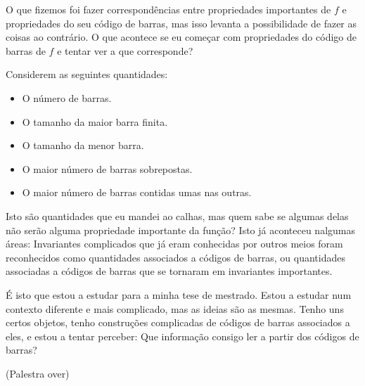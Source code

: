 \documentclass[12pt]{article}
\theoremstyle{nonumberplain}
\begin{document}
O que fizemos foi fazer correspondências entre propriedades importantes de $f$ e propriedades do seu código de barras, mas isso levanta a possibilidade de fazer as coisas ao contrário. O que acontece se eu começar com propriedades do código de barras de $f$ e tentar ver a que corresponde?

Considerem as seguintes quantidades:
\begin{itemize}
\item O número de barras.
\item O tamanho da maior barra finita.
\item O tamanho da menor barra.
\item O maior número de barras sobrepostas.
\item O maior número de barras contidas umas nas outras.
\end{itemize}

Isto são quantidades que eu mandei ao calhas, mas quem sabe se algumas delas não serão alguma propriedade importante da função? Isto já aconteceu nalgumas áreas: Invariantes complicados que já eram conhecidas por outros meios foram reconhecidos como quantidades associados a códigos de barras, ou quantidades associadas a códigos de barras que se tornaram em invariantes importantes.

É isto que estou a estudar para a minha tese de mestrado. Estou a estudar num contexto diferente e mais complicado, mas as ideias são as mesmas. Tenho uns certos objetos, tenho construções complicadas de códigos de barras associados a eles, e estou a tentar perceber: Que informação consigo ler a partir dos códigos de barras?

(Palestra over)
\end{document}
